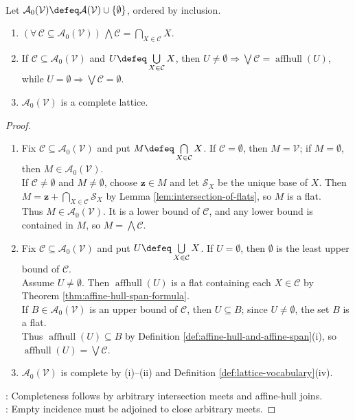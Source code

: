 \begin{theorem} \label{thm:lattice-of-flats} \\
Let $\mathcal{A}_0(\mathcal{V})\defeq\mathcal{A}(\mathcal{V})\cup\{\emptyset\}$, ordered by inclusion.
\begin{enumerate}[label=(\roman*)]
\setlength{\itemsep}{0pt}
\item $(\forall\,\mathcal{C}\subseteq\mathcal{A}_0(\mathcal{V}))\,\bigwedge\mathcal{C}=\bigcap\limits_{X\in\mathcal{C}}X$.
\item If $\mathcal{C}\subseteq\mathcal{A}_0(\mathcal{V})$ and $U\defeq\bigcup\limits_{X\in\mathcal{C}}X$, then $U\neq\emptyset\Rightarrow\bigvee\mathcal{C}=\operatorname{affhull}(U)$, while $U=\emptyset\Rightarrow\bigvee\mathcal{C}=\emptyset$.
\item $\mathcal{A}_0(\mathcal{V})$ is a complete lattice.
\end{enumerate}
\begin{proof}
\begin{enumerate}[label=(\roman*)]
\setlength{\itemsep}{0pt}
\item Fix $\mathcal{C}\subseteq\mathcal{A}_0(\mathcal{V})$ and put $M\defeq\bigcap\limits_{X\in\mathcal{C}}X$. If $\mathcal{C}=\emptyset$, then $M=\mathcal{V}$; if $M=\emptyset$, then $M\in\mathcal{A}_0(\mathcal{V})$.\\
If $\mathcal{C}\neq\emptyset$ and $M\neq\emptyset$, choose $\mathbf{z}\in M$ and let $\mathcal{S}_X$ be the unique base of $X$. Then $M=\mathbf{z}+\bigcap\limits_{X\in\mathcal{C}}\mathcal{S}_X$ by Lemma \ref{lem:intersection-of-flats}, so $M$ is a flat.\\
Thus $M\in\mathcal{A}_0(\mathcal{V})$. It is a lower bound of $\mathcal{C}$, and any lower bound is contained in $M$, so $M=\bigwedge\mathcal{C}$.
\item Fix $\mathcal{C}\subseteq\mathcal{A}_0(\mathcal{V})$ and put $U\defeq\bigcup\limits_{X\in\mathcal{C}}X$. If $U=\emptyset$, then $\emptyset$ is the least upper bound of $\mathcal{C}$.\\
Assume $U\neq\emptyset$. Then $\operatorname{affhull}(U)$ is a flat containing each $X\in\mathcal{C}$ by Theorem \ref{thm:affine-hull-span-formula}.\\
If $B\in\mathcal{A}_0(\mathcal{V})$ is an upper bound of $\mathcal{C}$, then $U\subseteq B$; since $U\neq\emptyset$, the set $B$ is a flat.\\
Thus $\operatorname{affhull}(U)\subseteq B$ by Definition \ref{def:affine-hull-and-affine-span}(i), so $\operatorname{affhull}(U)=\bigvee\mathcal{C}$.
\item $\mathcal{A}_0(\mathcal{V})$ is complete by (i)--(ii) and Definition \ref{def:lattice-vocabulary}(iv).
\end{enumerate}
: Completeness follows by arbitrary intersection meets and affine-hull joins.\\
: Empty incidence must be adjoined to close arbitrary meets.
\end{proof}
\end{theorem}

